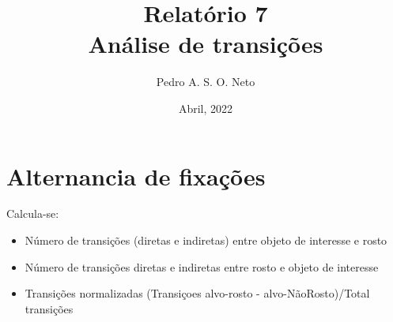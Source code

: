 \documentclass{article}
\title{Relatório 7 \\ Análise de transições}
\author{Pedro A. S. O. Neto}
\date{Abril, 2022}
\begin{document}
\maketitle

\section{Alternancia de fixações}

Calcula-se:

\begin{itemize}
  \item Número de transições (diretas e indiretas) entre objeto de interesse e rosto
  \item Número de transições diretas e indiretas entre rosto e objeto de interesse 
  \item Transições normalizadas (Transiçoes alvo-rosto - alvo-NãoRosto)/Total transições
\end{itemize}

\end{document}
